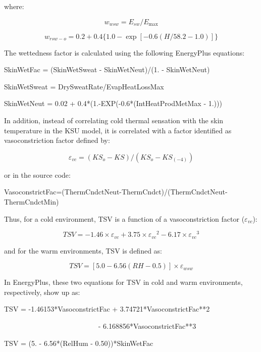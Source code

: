 where:

\begin{equation}
{w_{wsw}} = {E_{sw}}/{E_{\max }}
\end{equation}

\begin{equation}
{w_{rsw - o}} = 0.2 + 0.4\{ 1.0 - \exp [ - 0.6(H/58.2 - 1.0)]\}
\end{equation}

The wettedness factor is calculated using the following EnergyPlus equations:

SkinWetFac = (SkinWetSweat - SkinWetNeut)/(1. - SkinWetNeut)

SkinWetSweat = DrySweatRate/EvapHeatLossMax

SkinWetNeut = 0.02 + 0.4*(1.-EXP(-0.6*(IntHeatProdMetMax - 1.)))

In addition, instead of correlating cold thermal sensation with the skin temperature in the KSU model, it is correlated with a factor identified as vasoconstriction factor defined by:

\begin{equation}
{\varepsilon_{vc}} = (K{S_o} - KS)/(K{S_o} - K{S_{( - 4)}})
\end{equation}

or in the source code:

VasoconstrictFac=(ThermCndctNeut-ThermCndct)/(ThermCndctNeut-ThermCndctMin)

Thus, for a cold environment, TSV is a function of a vasoconstriction factor (\({\varepsilon_{vc}}\)):

\begin{equation}
TSV =  - 1.46 \times {\varepsilon_{vc}} + 3.75 \times {\varepsilon_{vc}}^2 - 6.17 \times {\varepsilon_{vc}}^3
\end{equation}

and for the warm environments, TSV is defined as:

\begin{equation}
TSV = [5.0 - 6.56(RH - 0.5)] \times {\varepsilon_{wsw}}
\end{equation}

In EnergyPlus, these two equations for TSV in cold and warm environments, respectively, show up as:

TSV = -1.46153*VasoconstrictFac + 3.74721*VasoconstrictFac**2

~~~~~~~~~~~~~~~~~~~~~~~~~~ - 6.168856*VasoconstrictFac**3

TSV = (5. - 6.56*(RelHum - 0.50))*SkinWetFac

